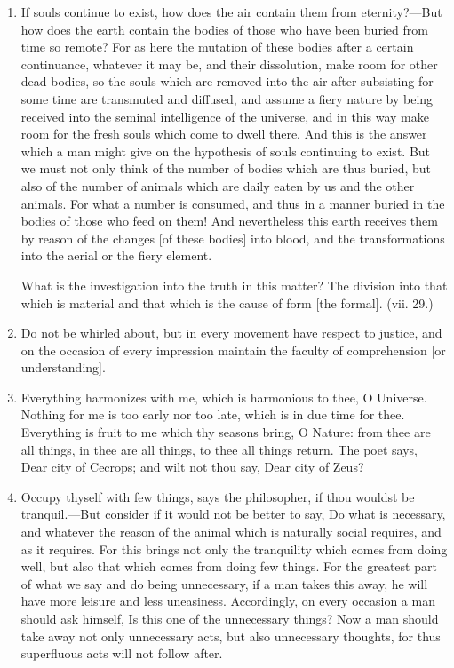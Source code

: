 \begin{enumerate}
\item If souls continue to exist, how does the air contain them from eternity?—But how does the earth contain the bodies of those who have been buried from time so remote? For as here the mutation of these bodies after a certain continuance, whatever it may be, and their dissolution, make room for other dead bodies, so the souls which are removed into the air after subsisting for some time are transmuted and diffused, and assume a fiery nature by being received into the seminal intelligence of the universe, and in this way make room for the fresh souls which come to dwell there. And this is the answer which a man might give on the hypothesis of souls continuing to exist. But we must not only think of the number of bodies which are thus buried, but also of the number of animals which are daily eaten by us and the other animals. For what a number is consumed, and thus in a manner buried in the bodies of those who feed on them! And nevertheless this earth receives them by reason of the changes [{\clarify of these bodies}] into blood, and the transformations into the aerial or the fiery element.

What is the investigation into the truth in this matter? The division into that which is material and that which is the cause of form [{\clarify the formal}]. (vii. 29.)

\item Do not be whirled about, but in every movement have respect to justice, and on the occasion of every impression maintain the faculty of comprehension [{\clarify or understanding}].

\item Everything harmonizes with me, which is harmonious to thee, O Universe. Nothing for me is too early nor too late, which is in due time for thee. Everything is fruit to me which thy seasons bring, O Nature: from thee are all things, in thee are all things, to thee all things return. The poet says, Dear city of Cecrops; and wilt not thou say, Dear city of Zeus?

\item Occupy thyself with few things, says the philosopher, if thou wouldst be tranquil.—But consider if it would not be better to say, Do what is necessary, and whatever the reason of the animal which is naturally social requires, and as it requires. For this brings not only the tranquility which comes from doing well, but also that which comes from doing few things. For the greatest part of what we say and do being unnecessary, if a man takes this away, he will have more leisure and less uneasiness. Accordingly, on every occasion a man should ask himself, Is this one of the unnecessary things? Now a man should take away not only unnecessary acts, but also unnecessary thoughts, for thus superfluous acts will not follow after.


\end{enumerate}
